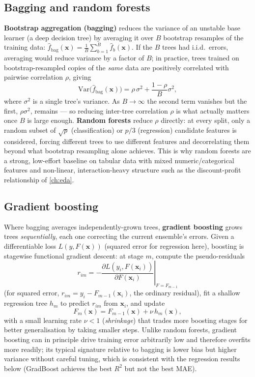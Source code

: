 \subsection{Bagging and random forests}
\textbf{Bootstrap aggregation (bagging)} reduces the variance of an
unstable base learner (a deep decision tree) by averaging it over $B$
bootstrap resamples of the training data: $\hat f_{\text{bag}}(\mathbf x)
= \frac1B\sum_{b=1}^B \hat f_b(\mathbf x)$. If the $B$ trees had
i.i.d.\ errors, averaging would reduce variance by a factor of $B$; in
practice, trees trained on bootstrap-resampled copies of the \emph{same}
data are positively correlated with pairwise correlation $\rho$, giving
\begin{equation}
  \mathrm{Var}\bigl(\hat f_{\text{bag}}(\mathbf x)\bigr)
    = \rho\,\sigma^2 + \frac{1-\rho}{B}\sigma^2,
  \label{eq:bagging-variance}
\end{equation}
where $\sigma^2$ is a single tree's variance. As $B\to\infty$ the second
term vanishes but the first, $\rho\sigma^2$, remains — so reducing
inter-tree correlation $\rho$ is what actually matters once $B$ is large
enough. \textbf{Random forests} reduce $\rho$ directly: at every split,
only a random subset of $\sqrt p$ (classification) or $p/3$ (regression)
candidate features is considered, forcing different trees to use
different features and decorrelating them beyond what bootstrap resampling
alone achieves. This is why random forests are a strong, low-effort
baseline on tabular data with mixed numeric/categorical features and
non-linear, interaction-heavy structure such as the discount-profit
relationship of \cref{ch:eda}.

\subsection{Gradient boosting}
Where bagging averages independently-grown trees, \textbf{gradient
boosting} grows trees \emph{sequentially}, each one correcting the
current ensemble's errors. Given a differentiable loss
$L(y,F(\mathbf x))$ (squared error for regression here), boosting is
stagewise functional gradient descent: at stage $m$, compute the
pseudo-residuals
\begin{equation}
  r_{im} = -\left.\frac{\partial L(y_i, F(\mathbf x_i))}{\partial F(\mathbf x_i)}\right|_{F=F_{m-1}}
  \label{eq:boost-residual}
\end{equation}
(for squared error, $r_{im}=y_i - F_{m-1}(\mathbf x_i)$, the ordinary
residual), fit a shallow regression tree $h_m$ to predict $r_{im}$ from
$\mathbf x_i$, and update
\begin{equation}
  F_m(\mathbf x) = F_{m-1}(\mathbf x) + \nu\, h_m(\mathbf x),
  \label{eq:boost-update}
\end{equation}
with a small learning rate $\nu<1$ (\emph{shrinkage}) that trades more
boosting stages for better generalisation by taking smaller steps. Unlike
random forests, gradient boosting can in principle drive training error
arbitrarily low and therefore overfits more readily; its typical
signature relative to bagging is lower bias but higher variance without
careful tuning, which is consistent with the regression results below
(GradBoost achieves the best $R^2$ but not the best MAE).

